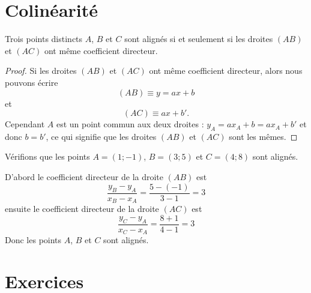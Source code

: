 \section{Colinéarité}

\begin{theorem}
    Trois points distincts \( A\), \( B\) et \( C\) sont alignés si et seulement si les droites \( (AB)\) et \( (AC)\) ont même coefficient directeur.
\end{theorem}

\begin{proof}
    Si les droites \( (AB)\) et \( (AC)\) ont même coefficient directeur, alors nous pouvons écrire
    \begin{equation}
        (AB)\equiv y=ax+b
    \end{equation}
    et
    \begin{equation}
        (AC)\equiv ax+b'.
    \end{equation}
    Cependant \( A\) est un point commun aux deux droites : \( y_A=ax_A+b=ax_A+b'\) et donc \( b=b'\), ce qui signifie que les droites \( (AB)\) et \( (AC)\) sont les mêmes.
\end{proof}

\begin{example}
    Vérifions que les points \( A=(1;-1)\), \( B=(3;5)\) et \( C=(4;8)\) sont alignés.

    D'abord le coefficient directeur de la droite \( (AB)\) est 
    \begin{equation}
        \frac{ y_B-y_A }{ x_B-x_A }=\frac{ 5-(-1) }{ 3-1 }=3
    \end{equation}
    ensuite le coefficient directeur de la droite \( (AC)\) est
    \begin{equation}
        \frac{ y_C-y_A }{ x_C-x_A }=\frac{ 8+1 }{ 4-1 }=3
    \end{equation}
    Donc les points \( A\), \( B\) et \( C\) sont alignés.
\end{example}

\section{Exercices}

